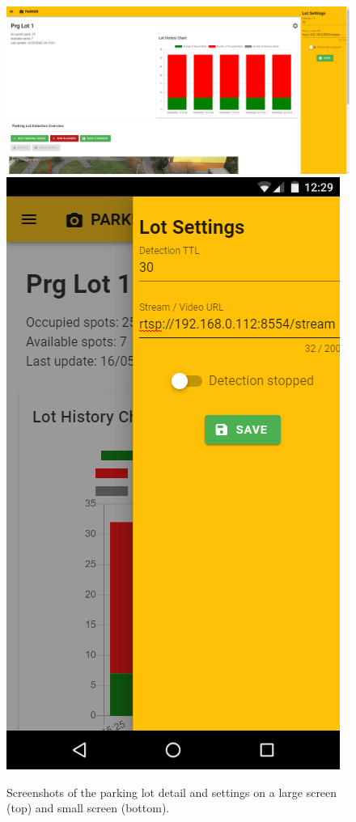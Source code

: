\documentclass[thesis=M,english]{FITthesis}[2019/03/06]
\begin{document}
\begin{figure}[ht]
	\centering
		\includegraphics[scale=0.25]{imgs/ss-settings.png}
	\includegraphics[scale=0.5]{imgs/ss-mobile-settings.png}
	\caption{Screenshots of the parking lot detail and settings on a large screen (top) and small screen (bottom).}
	\label{label:ss_dashboard_small}
\end{figure}
\end{document}
